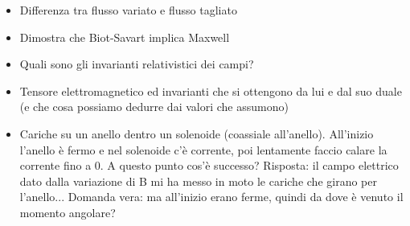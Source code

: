 \documentclass[a4paper,NoNotes,GeneralMath]{stdmdoc}
\begin{document}
\begin{itemize}
		\item Differenza tra flusso variato e flusso tagliato
		\item Dimostra che Biot-Savart implica Maxwell
		\item Quali sono gli invarianti relativistici dei campi?
		\item Tensore elettromagnetico ed invarianti che si ottengono da lui e dal suo duale (e che cosa possiamo dedurre dai valori che assumono)
		\item Cariche su un anello dentro un solenoide (coassiale all'anello). All'inizio l'anello è fermo e nel solenoide c'è corrente, poi lentamente faccio calare la corrente fino a 0. A questo punto cos'è successo? Risposta: il campo elettrico dato dalla variazione di B mi ha messo in moto le cariche che girano per l'anello... Domanda vera: ma all'inizio erano ferme, quindi da dove è venuto il momento angolare?
	\end{itemize}
\end{document}

